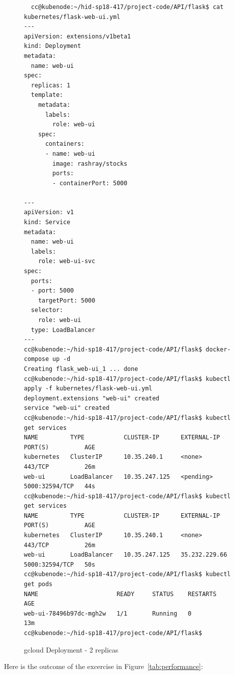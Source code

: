 \begin{figure}[htb]
  \begin{footnotesize}  
  \begin{verbatim}
  cc@kubenode:~/hid-sp18-417/project-code/API/flask$ cat kubernetes/flask-web-ui.yml
---
apiVersion: extensions/v1beta1
kind: Deployment
metadata:
  name: web-ui
spec:
  replicas: 1
  template:
    metadata:
      labels:
        role: web-ui
    spec:
      containers:
      - name: web-ui
        image: rashray/stocks
        ports:
        - containerPort: 5000

---
apiVersion: v1
kind: Service
metadata:
  name: web-ui
  labels:
    role: web-ui-svc
spec:
  ports:
  - port: 5000
    targetPort: 5000
  selector:
    role: web-ui
  type: LoadBalancer
---
cc@kubenode:~/hid-sp18-417/project-code/API/flask$ docker-compose up -d
Creating flask_web-ui_1 ... done
cc@kubenode:~/hid-sp18-417/project-code/API/flask$ kubectl apply -f kubernetes/flask-web-ui.yml
deployment.extensions "web-ui" created
service "web-ui" created
cc@kubenode:~/hid-sp18-417/project-code/API/flask$ kubectl get services
NAME         TYPE           CLUSTER-IP      EXTERNAL-IP   PORT(S)          AGE
kubernetes   ClusterIP      10.35.240.1     <none>        443/TCP          26m
web-ui       LoadBalancer   10.35.247.125   <pending>     5000:32594/TCP   44s
cc@kubenode:~/hid-sp18-417/project-code/API/flask$ kubectl get services
NAME         TYPE           CLUSTER-IP      EXTERNAL-IP     PORT(S)          AGE
kubernetes   ClusterIP      10.35.240.1     <none>          443/TCP          26m
web-ui       LoadBalancer   10.35.247.125   35.232.229.66   5000:32594/TCP   50s
cc@kubenode:~/hid-sp18-417/project-code/API/flask$ kubectl get pods
NAME                      READY     STATUS    RESTARTS   AGE
web-ui-78496b97dc-mgh2w   1/1       Running   0          13m
cc@kubenode:~/hid-sp18-417/project-code/API/flask$
  \end{verbatim}
\end{footnotesize}  

  \caption{gcloud Deployment - 2 replicas}
  \label{fig:project_deployment}
\end{figure}

Here is the outcome of the excercise in Figure~\ref{tab:performance}:


